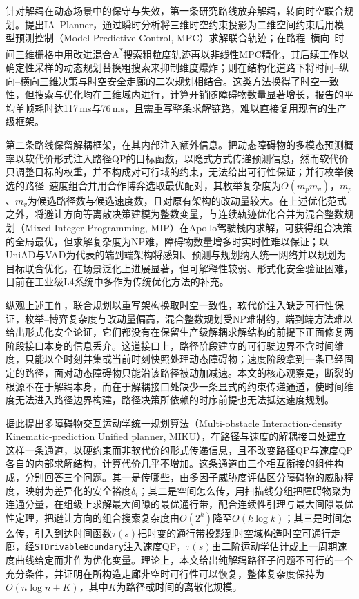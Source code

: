 \documentclass[a4paper,zihao=5]{ctexart}
\theoremstyle{definition}
\begin{document}
针对解耦在动态场景中的保守与失效，第一条研究路线放弃解耦，转向时空联合规划。\citet{yang2021_ia_planner}提出IA~Planner，通过瞬时分析将三维时空约束投影为二维空间约束后用模型预测控制（Model Predictive Control, MPC）求解联合轨迹；\citet{hu2023_hybrid_astar_slt}在路程--横向--时间三维栅格中用改进混合A\textsuperscript{*}搜索粗粒度轨迹再以非线性MPC精化，其后续工作\citep{hu2025_dp_nmpc}以确定性采样的动态规划替换粗搜索来抑制维度爆炸；\citet{qiao2025stjoint}则在结构化道路下将时间--纵向--横向三维决策与时空安全走廊的二次规划相结合。这类方法换得了时空一致性，但搜索与优化均在三维域内进行，计算开销随障碍物数量显著增长，\citet{hu2023_hybrid_astar_slt}报告的平均单帧耗时达117\,ms与76\,ms，且需重写整条求解链路，难以直接复用现有的生产级框架。

第二条路线保留解耦框架，在其内部注入额外信息。\citet{han2026_contingency}把动态障碍物的多模态预测概率以软代价形式注入路径QP的目标函数，以隐式方式传递预测信息，然而软代价只调整目标的权重，并不构成对可行域的约束，无法给出可行性保证；\citet{zhang2023_dp_rcg}并行枚举候选的路径--速度组合并用合作博弈选取最优配对，其枚举复杂度为$O(m_p m_v)$，$m_p$、$m_v$为候选路径数与候选速度数，且对原有架构的改动量较大。在上述优化范式之外，\citet{kessler2023}将避让方向等离散决策建模为整数变量，与连续轨迹优化合并为混合整数规划（Mixed-Integer Programming, MIP）在Apollo驾驶栈内求解，可获得组合决策的全局最优，但求解复杂度为NP难，障碍物数量增多时实时性难以保证；以UniAD\citep{hu2023uniad}与VAD\citep{jiang2023vad}为代表的端到端架构将感知、预测与规划纳入统一网络并以规划为目标联合优化\citep{li2024decision,zhang2018autonomous}，在场景泛化上进展显著，但可解释性较弱、形式化安全验证困难，目前在工业级L4系统中多作为传统优化方法的补充。

纵观上述工作，联合规划以重写架构换取时空一致性，软代价注入缺乏可行性保证，枚举--博弈复杂度与改动量偏高，混合整数规划受NP难制约，端到端方法难以给出形式化安全论证，它们都没有在保留生产级解耦求解结构的前提下正面修复两阶段接口本身的信息丢弃。这道接口上，路径阶段建立的可行驶边界不含时间维度，只能以全时刻并集或当前时刻快照处理动态障碍物；速度阶段拿到一条已经固定的路径，面对动态障碍物只能沿该路径被动加减速。本文的核心观察是，断裂的根源不在于解耦本身，而在于解耦接口处缺少一条显式的约束传递通道，使时间维度无法进入路径边界构建，路径决策所依赖的时序前提也无法抵达速度规划。

据此提出多障碍物交互运动学统一规划算法（Multi-obstacle Interaction-density Kinematic-prediction Unified planner, MIKU），在路径与速度的解耦接口处建立这样一条通道，以硬约束而非软代价的形式传递信息，且不改变路径QP与速度QP各自的内部求解结构，计算代价几乎不增加。这条通道由三个相互衔接的组件构成，分别回答三个问题。其一是传哪些，由多因子威胁度评估区分障碍物的威胁程度，映射为差异化的安全裕度$\delta_i$；其二是空间怎么传，用扫描线分组把障碍物聚为连通分量，在组级上求解最大间隙的最优通行带，配合连续性引理与最大间隙最优性定理，把避让方向的组合搜索复杂度由$O(2^k)$降至$O(k\log k)$；其三是时间怎么传，引入到达时间函数$\tau(s)$把时变的通行带投影到时空域构造时空可通行走廊，经\texttt{STDrivableBoundary}注入速度QP，$\tau(s)$由二阶运动学估计或上一周期速度曲线给定而非作为优化变量。理论上，本文给出纯解耦路径子问题不可行的一个充分条件，并证明在所构造走廊非空时可行性可以恢复，整体复杂度保持为$O(n\log n + K)$，其中$K$为路径或时间的离散化规模。
\end{document}
